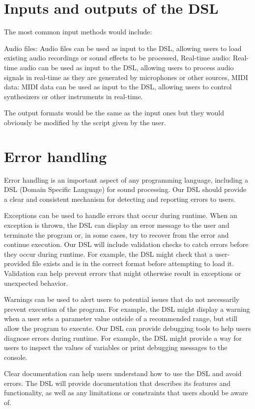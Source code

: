 \section{Inputs and outputs of the DSL}
\par The most common input methods would include:
\begin{itemize}
    \hitem Audio files: Audio files can be used as input to the 
    DSL, allowing users to load existing audio recordings or sound 
    effects to be processed,
    \hitem Real-time audio: Real-time audio can be used as input to 
    the DSL, allowing users to process audio signals in real-time 
    as they are generated by microphones or other sources,
    \hitem MIDI data: MIDI data can be used as input to the DSL, 
    allowing users to control synthesizers or other instruments in 
    real-time.
\end{itemize}

The output formats would be the same as the input ones but they 
would obviously be modified by the script given by the user.

\section{Error handling}
Error handling is an important aspect of any programming language, 
including a DSL (Domain Specific Language) for sound processing. 
Our DSL should provide a clear and consistent mechanism for 
detecting and reporting errors to users.

Exceptions can be used to handle errors that occur during runtime. 
When an exception is thrown, the DSL can display an error message 
to the user and terminate the program or, in some cases, try to 
recover from the error and continue execution.
Our DSL will include validation checks to catch errors before they 
occur during runtime. For example, the  DSL might check that a user-
provided file exists and is in the correct format before attempting 
to load it. Validation can help prevent errors that might otherwise 
result in exceptions or unexpected behavior.

Warnings can be used to alert users to potential issues that do not 
necessarily prevent execution of the program. For example, the DSL 
might display a warning when a user sets a parameter value outside 
of a recommended range, but still allow the program to execute.
Our DSL can provide debugging tools to help users diagnose errors 
during runtime. For example, the DSL might provide a way for users 
to inspect the values of variables or print debugging messages to 
the console.

Clear documentation can help users understand how to use the DSL 
and avoid errors. The DSL will provide documentation that 
describes its features and functionality, as well as any 
limitations or constraints that users should be aware of.
